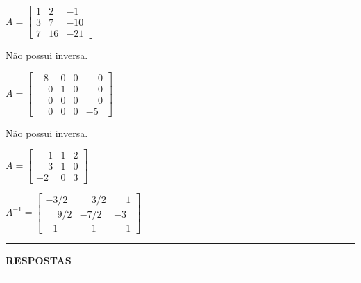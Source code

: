 \documentclass[12pt]{exam}
\begin{document}
\begin{exercicio}
  $
    A =\begin{bmatrix}
        1 & 2 & -1\\
        3 & 7 & -10\\
        7 & 16 & -21
    \end{bmatrix}
  $
  \begin{solucao}
    Não possui inversa.
  \end{solucao}
\end{exercicio}

\begin{exercicio}
  $
    A =\begin{bmatrix}
        -8 & 0 & 0 & \phantom{-} 0\\
        \phantom{-} 0 & 1 & 0 & \phantom{-} 0\\
        \phantom{-} 0 & 0 & 0 & \phantom{-} 0\\
        \phantom{-} 0 & 0 & 0 & -5
    \end{bmatrix}
  $
  \begin{solucao}
   Não possui inversa.
  \end{solucao}
\end{exercicio}

\begin{exercicio}\label{matrizinversafim}
  $
    A =\begin{bmatrix}
        \phantom{-} 1 & 1 & 2\\
        \phantom{-} 3 & 1 & 0\\
        -2 & 0 & 3
    \end{bmatrix}
  $
  \begin{solucao}
    $
      A^{-1} =\begin{bmatrix}
        -3/2 & \phantom{-} 3/2 & \phantom{-} 1\\
        \phantom{-} 9/2 & -7/2 & -3\\
        -1 & \phantom{-} 1 & \phantom{-} 1
      \end{bmatrix}
    $
  \end{solucao}
\end{exercicio}

\newpage
{}
\hrule
\begin{center}
{\large\bf RESPOSTAS}
\end{center}
\hrule

\end{document}
